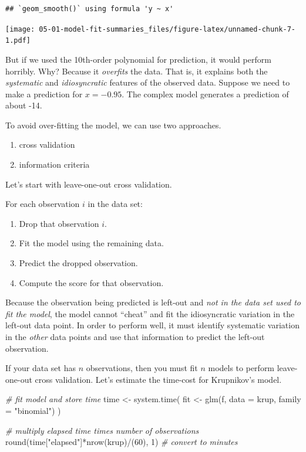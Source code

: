 \documentclass[
]{book}
\newenvironment{Shaded}{\begin{snugshade}}{\end{snugshade}}
\newcommand{\AttributeTok}[1]{\textcolor[rgb]{0.77,0.63,0.00}{#1}}
\newcommand{\CommentTok}[1]{\textcolor[rgb]{0.56,0.35,0.01}{\textit{#1}}}
\newcommand{\DecValTok}[1]{\textcolor[rgb]{0.00,0.00,0.81}{#1}}
\newcommand{\FunctionTok}[1]{\textcolor[rgb]{0.00,0.00,0.00}{#1}}
\newcommand{\NormalTok}[1]{#1}
\newcommand{\OtherTok}[1]{\textcolor[rgb]{0.56,0.35,0.01}{#1}}
\newcommand{\SpecialCharTok}[1]{\textcolor[rgb]{0.00,0.00,0.00}{#1}}
\newcommand{\StringTok}[1]{\textcolor[rgb]{0.31,0.60,0.02}{#1}}
\providecommand{\tightlist}{%
  \setlength{\itemsep}{0pt}\setlength{\parskip}{0pt}}
\begin{document}
\begin{verbatim}
## `geom_smooth()` using formula 'y ~ x'
\end{verbatim}

\texttt{[image: 05-01-model-fit-summaries\_files/figure-latex/unnamed-chunk-7-1.pdf]}

But if we used the 10th-order polynomial for prediction, it would perform horribly. Why? Because it \emph{overfits} the data. That is, it explains both the \emph{systematic} and \emph{idiosyncratic} features of the observed data. Suppose we need to make a prediction for \(x = -0.95\). The complex model generates a prediction of about -14.

To avoid over-fitting the model, we can use two approaches.

\begin{enumerate}
\def\labelenumi{\arabic{enumi}.}
\tightlist
\item
  cross validation
\item
  information criteria
\end{enumerate}

Let's start with leave-one-out cross validation.

For each observation \(i\) in the data set:

\begin{enumerate}
\def\labelenumi{\arabic{enumi}.}
\tightlist
\item
  Drop that observation \(i\).
\item
  Fit the model using the remaining data.
\item
  Predict the dropped observation.
\item
  Compute the score for that observation.
\end{enumerate}

Because the observation being predicted is left-out and \emph{not in the data set used to fit the model}, the model cannot ``cheat'' and fit the idiosyncratic variation in the left-out data point. In order to perform well, it must identify systematic variation in the \emph{other} data points and use that information to predict the left-out observation.

If your data set has \(n\) observations, then you must fit \(n\) models to perform leave-one-out cross validation. Let's estimate the time-cost for Krupnikov's model.

\begin{Shaded}
\begin{Highlighting}[]
\CommentTok{\# fit model and store time}
\NormalTok{time }\OtherTok{\textless{}{-}} \FunctionTok{system.time}\NormalTok{( }
\NormalTok{  fit }\OtherTok{\textless{}{-}} \FunctionTok{glm}\NormalTok{(f, }\AttributeTok{data =}\NormalTok{ krup, }\AttributeTok{family =} \StringTok{"binomial"}\NormalTok{)}
\NormalTok{  )}

\CommentTok{\# multiply elapsed time times number of observations}
\FunctionTok{round}\NormalTok{(time[}\StringTok{"elapsed"}\NormalTok{]}\SpecialCharTok{*}\FunctionTok{nrow}\NormalTok{(krup)}\SpecialCharTok{/}\NormalTok{(}\DecValTok{60}\NormalTok{), }\DecValTok{1}\NormalTok{)  }\CommentTok{\# convert to minutes}
\end{Highlighting}
\end{Shaded}
\end{document}

